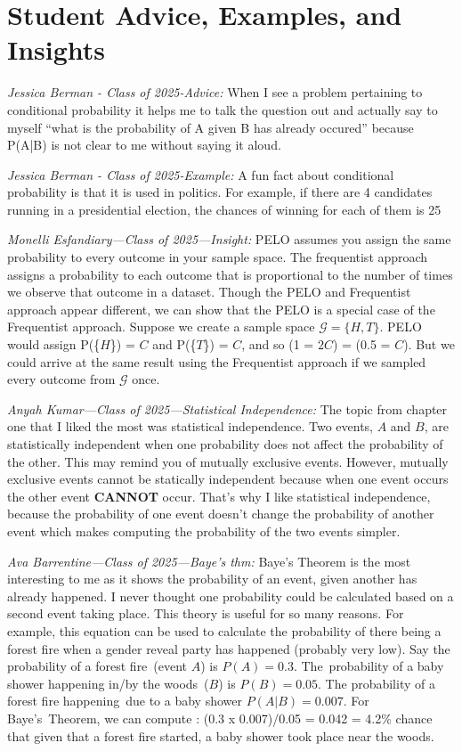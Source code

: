 \section{Student Advice, Examples, and Insights}


\textit{Jessica Berman - Class of 2025-Advice:} When I see a problem pertaining to conditional probability it helps me to talk the question out and actually say to myself “what is the probability of A given B has already occured” because P(A|B) is not clear to me without saying it aloud.

\textit{Jessica Berman - Class of 2025-Example:} A fun fact about conditional probability is that it is used in politics. For example, if there are 4 candidates running in a presidential election, the chances of winning for each of them is 25%


\textit{Monelli Esfandiary---Class of 2025---Insight:}
PELO assumes you assign the same probability to every outcome in your sample space.
The frequentist approach assigns a probability to each outcome that is proportional to the number of times we observe that outcome in a dataset.
Though the PELO and Frequentist approach appear different, we can show that the PELO is a special case of the Frequentist approach. 
Suppose we create a sample space $\mathcal{G} = \{H,T\}$.
PELO would assign P(\{$H$\}) = $C$ and P(\{$T$\}) = $C$, and so (1 = $2C$) = (0.5 = $C$). 
But we could arrive at the same result using the Frequentist approach if we sampled every outcome from $\mathcal{G}$ once. 


\textit{Anyah Kumar---Class of 2025---Statistical Independence:} The topic from chapter one that I liked the most was statistical independence.
Two events, $A$ and $B$, are statistically independent when one probability does not affect the probability of the other.
This may remind you of mutually exclusive events. However, mutually exclusive events cannot be statically independent because when one event occurs the other event \textbf{CANNOT} occur. 
That's why I like statistical independence, because the probability of one event doesn't change the probability of another event which makes computing the probability of the two events simpler.

\textit{Ava Barrentine---Class of 2025---Baye's thm:} Baye’s Theorem is the most interesting to me as it shows the probability of an event, given another has already happened. I never thought one probability could be calculated based on a second event taking place. This theory is useful for so many reasons. For example, this equation can be used to calculate the probability of there being a forest fire when a gender reveal party has happened (probably very low). Say the probability of a forest fire~(event $A$) is $P(A) = 0.3$. The probability of a baby shower happening in/by the woods~($B$) is $P(B)= 0.05$. The probability of a forest fire happening due to a baby shower $P(A|B) = 0.007$. For Baye's Theorem, we can compute : (0.3 x 0.007)/0.05 = 0.042 = 4.2\% chance that given that a forest fire started, a baby shower took place near the woods.

